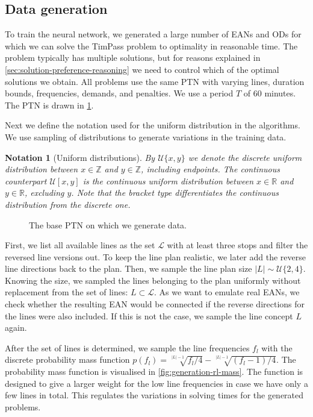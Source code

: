 \documentclass[english, 12pt, a4paper, sci, utf8, a-2b, online]{aaltothesis}
\newtheorem{notation}{Notation}
\newcommand{\Z}{\mathbb{Z}}
\newcommand{\R}{\mathbb{R}}
\newcommand{\unif}[1]{\mathcal{U}\{#1\}}
\newcommand{\unifcont}[1]{\mathcal{U}[#1]}
\begin{document}
\subsection{Data generation}
\label{sec:data-gen}

To train the neural network, we generated a large number of EANs and ODs for which we can solve the TimPass problem to optimality in reasonable time. The problem typically has multiple solutions, but for reasons explained in \cref{sec:solution-preference-reasoning} we need to control which of the optimal solutions we obtain. All problems use the same PTN with varying lines, duration bounds, frequencies, demands, and penalties. We use a period $T$ of 60 minutes. The PTN is drawn in \cref{fig:base-ptn}.

Next we define the notation used for the uniform distribution in the algorithms. We use sampling of distributions to generate variations in the training data.
\begin{notation}[Uniform distributions]
    By $\mathcal{U}\{x, y\}$ we denote the discrete uniform distribution between $x \in \Z$ and $y\in \Z$, including endpoints. The continuous counterpart $\mathcal{U}[x, y]$ is the continuous uniform distribution between $x \in \R$ and $y \in \R$, excluding $y$. Note that the bracket type differentiates the continuous distribution from the discrete one.
\end{notation}


\begin{figure}
    \centering
     
    \caption{The base PTN on which we generate data.}
    \label{fig:base-ptn}
\end{figure}


First, we list all available lines as the set $\mathcal{L}$ with at least three stops and filter the reversed line versions out. To keep the line plan realistic, we later add the reverse line directions back to the plan. Then, we sample the line plan size $|L| \sim \unif{2, 4}$. Knowing the size, we sampled the lines belonging to the plan uniformly without replacement from the set of lines: $L \subset \mathcal{L}$. As we want to emulate real EANs, we check whether the resulting EAN would be connected if the reverse directions for the lines were also included. If this is not the case, we sample the line concept $L$ again.



After the set of lines is determined, we sample the line frequencies $f_l$ with the discrete probability mass function $p(f_l) = \sqrt[|L| - 1]{f_l / 4} - \sqrt[|L| - 1]{(f_l - 1) / 4}$. The probability mass function is visualised in \cref{fig:generation-rl-mass}. The function is designed to give a larger weight for the low line frequencies in case we have only a few lines in total. This regulates the variations in solving times for the generated problems. %
\end{document}
